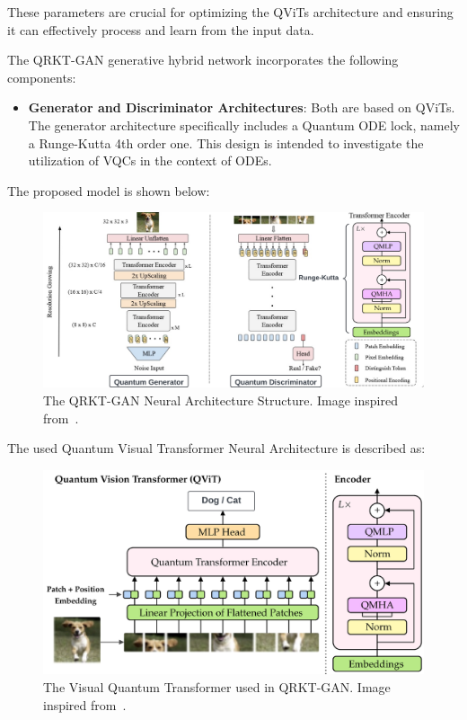 \documentclass[12pt,a4paper]{report}
\begin{document}
These parameters are crucial for optimizing the QViTs architecture and ensuring it can effectively process and learn from the input data.

The QRKT-GAN generative hybrid network incorporates the following components:

\begin{itemize}
  \item \textbf{Generator and Discriminator Architectures}: Both are based on QViTs. The generator architecture specifically includes a  Quantum ODE lock, namely a Runge-Kutta 4th order one. This design is intended to investigate the utilization of VQCs in the context of ODEs.
\end{itemize}

The proposed model is shown below:

\begin{figure}[th]
  \centering
  \includegraphics[scale=0.193]{./pics/Blank diagram - Page 1 (2).png}
  \caption[The QRKT-GAN Neural Architecture Structure]{The QRKT-GAN Neural Architecture Structure. Image inspired from~\cite{Comajoan_Cara_2024, jiang2021transgan}.}
  \label{fig:p11}
\end{figure}

The used Quantum Visual Transformer Neural Architecture is described as:
\\
\begin{figure}[th]
  \centering
  \includegraphics[scale=0.12]{./pics/Blank diagram - Page 1.png}
  \caption[The Visual Quantum Transformer used in QRKT-GAN]{The Visual Quantum Transformer used in QRKT-GAN. Image inspired from~\cite{Comajoan_Cara_2024}.}
  \label{fig:p12}
\end{figure}
\end{document}
